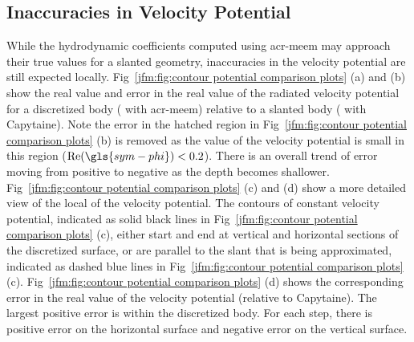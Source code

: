 \documentclass[lineno]{JFM-FLM_Au}
\begin{document}
\subsection{Inaccuracies in Velocity Potential}
While the hydrodynamic coefficients computed using \gls{acr-meem} may approach their true values for a slanted geometry, inaccuracies in the velocity potential are still expected locally.
Fig~\ref{jfm:fig:contour potential comparison plots} (a) and (b) show the real value and error in the real value of the radiated velocity potential for a discretized body (\modelled{} with \gls{acr-meem}) relative to a slanted body (\modelled{} with Capytaine).
Note the error in the hatched region in Fig~\ref{jfm:fig:contour potential comparison plots} (b) is removed as the value of the velocity potential is small in this region ($\mathrm{Re}(\gls{sym-phi})<0.2$).
There is an overall trend of error moving from positive to negative as the depth becomes shallower.
Fig~\ref{jfm:fig:contour potential comparison plots} (c) and (d) show a more detailed view of the local \behaviour{} of the velocity potential.
The contours of constant velocity potential, indicated as solid black lines in Fig~\ref{jfm:fig:contour potential comparison plots} (c), either start and end at vertical and horizontal sections of the discretized surface, or are parallel to the slant that is being approximated, indicated as dashed blue lines in Fig~\ref{jfm:fig:contour potential comparison plots} (c).
Fig~\ref{jfm:fig:contour potential comparison plots} (d) shows the corresponding error in the real value of the velocity potential (relative to Capytaine).
The largest positive error is within the discretized body.
For each step, there is positive error on the horizontal surface and negative error on the vertical surface. 
\end{document}
